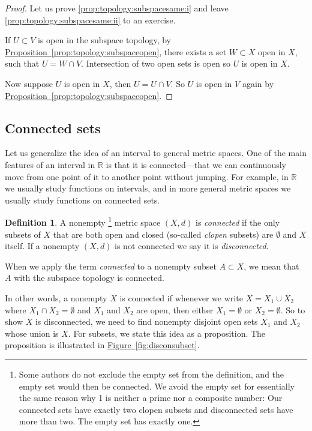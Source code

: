 \documentclass[12pt,openany]{book}
\newcommand{\R}{{\mathbb{R}}}
\newcommand{\myindex}[1]{#1\index{#1}}
\theoremstyle{plain}
\theoremstyle{remark}
\theoremstyle{definition}
\newtheorem{defn}[thm]{Definition}
\theoremstyle{exercise}
\theoremstyle{example}
\newcommand{\figureref}[1]{\hyperref[#1]{Figure~\ref*{#1}}}
\newcommand{\propref}[1]{\hyperref[#1]{Proposition~\ref*{#1}}}
\begin{document}
\begin{proof}
Let us prove
\ref{prop:topology:subspacesame:i}
and leave 
\ref{prop:topology:subspacesame:ii} to an exercise.

If $U \subset V$ is open in the subspace topology, by
\propref{prop:topology:subspaceopen}, there exists a set $W \subset X$
open in $X$, such that $U = W \cap V$.  Intersection of two open sets
is open so $U$ is open in $X$.

Now suppose $U$ is open in $X$, then $U = U \cap V$. So
$U$ is open in $V$ again by \propref{prop:topology:subspaceopen}.
\end{proof}

\subsection{Connected sets}

Let us generalize the idea of an interval to general metric spaces.  One of
the main features of an interval in $\R$ is that it is
connected---that we can continuously move from one point of it to
another point without jumping.
For example, in $\R$ we usually study functions on intervals,
and in more general metric spaces we usually study functions on connected sets.

\begin{defn}
A nonempty%
\footnote{Some authors do not exclude the empty set from the definition,
and the empty set would then be connected.
We avoid the empty set for essentially the same reason why
1 is neither a prime nor a composite number:  Our connected sets have exactly
two clopen subsets and disconnected sets have more than two.  The empty set
has exactly one.}
metric space $(X,d)$ is \emph{\myindex{connected}} if the
only subsets of $X$ that are both open and closed (so-called
\emph{\myindex{clopen}} subsets) are $\emptyset$ and $X$ itself.
If a nonempty $(X,d)$ is not connected we say it is
\emph{\myindex{disconnected}}.

When we apply the term \emph{connected} to a nonempty subset $A \subset X$, we 
mean that $A$ with the subspace topology is connected.
\end{defn}

In other words, a nonempty $X$ is connected if whenever we write
$X = X_1 \cup X_2$ where $X_1 \cap X_2 = \emptyset$ and $X_1$ and $X_2$ are
open, then either $X_1 = \emptyset$ or $X_2 = \emptyset$.
So to show $X$ is disconnected, we need to find nonempty
disjoint open sets $X_1$ and
$X_2$ whose union is $X$.
For subsets, we state this idea as a proposition.
The proposition is illustrated in \figureref{fig:disconsubset}.
\end{document}
